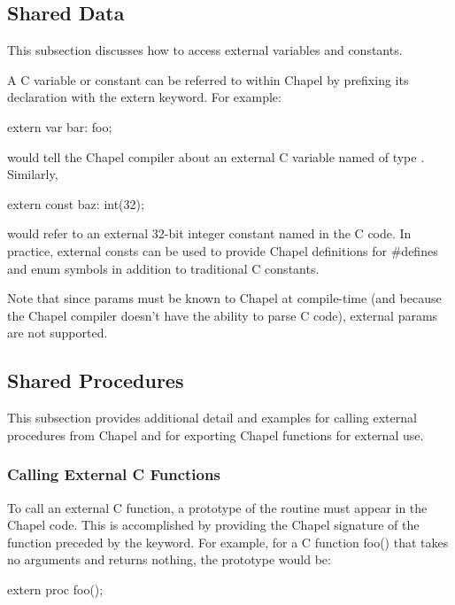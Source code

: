 \subsection{Shared Data}
\label{Shared_Data}

This subsection discusses how to access external variables and constants.

A C variable or constant can be referred to within Chapel by prefixing
its declaration with the extern keyword.  For example:
\begin{chapel}
    extern var bar: foo;
\end{chapel}
\noindent
would tell the Chapel compiler about an external C variable named
 of type .  Similarly, 
\begin{chapel}
   extern const baz: int(32);
\end{chapel}
would refer to an external 32-bit integer constant named  in the
C code.  In practice, external consts can be used to provide Chapel
definitions for \#defines and enum symbols in addition to traditional C
constants.

\begin{craychapel}
Note that since params must be known to Chapel at compile-time (and
because the Chapel compiler doesn't have the ability to parse C code),
external params are not supported.
\end{craychapel}

\subsection{Shared Procedures}
\label{Shared_Procedures}

This subsection provides additional detail and examples for calling external
procedures from Chapel and for exporting Chapel functions for external use.

\subsubsection{Calling External C Functions}
\label{Calling_External_C_Functions}

To call an external C function, a prototype of
the routine must appear in the Chapel code.  This is accomplished by providing
the Chapel signature of the function preceded by the  keyword.  For
example, for a C function foo() that takes no arguments and returns
nothing, the prototype would be:
\begin{chapel}
       extern proc foo();
\end{chapel}

